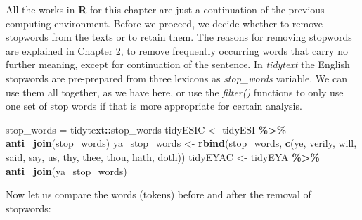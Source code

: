 \documentclass[
]{article}
\newenvironment{Shaded}{\begin{snugshade}}{\end{snugshade}}
\newcommand{\FunctionTok}[1]{\textcolor[rgb]{0.13,0.29,0.53}{\textbf{#1}}}
\newcommand{\NormalTok}[1]{#1}
\newcommand{\OtherTok}[1]{\textcolor[rgb]{0.56,0.35,0.01}{#1}}
\newcommand{\SpecialCharTok}[1]{\textcolor[rgb]{0.81,0.36,0.00}{\textbf{#1}}}
\newcommand{\StringTok}[1]{\textcolor[rgb]{0.31,0.60,0.02}{#1}}
\begin{document}
All the works in \textbf{R} for this chapter are just a continuation of the previous computing environment. Before we proceed, we decide whether to remove stopwords from the texts or to retain them. The reasons for removing stopwords are explained in Chapter 2, to remove frequently occurring words that carry no further meaning, except for continuation of the sentence. In \emph{tidytext} the English stopwords are pre-prepared from three lexicons as \emph{stop\_words} variable. We can use them all together, as we have here, or use the \emph{filter()} functions to only use one set of stop words if that is more appropriate for certain analysis.

\footnotesize

\begin{Shaded}
\begin{Highlighting}[]
\NormalTok{stop\_words }\OtherTok{=}\NormalTok{ tidytext}\SpecialCharTok{::}\NormalTok{stop\_words}
\NormalTok{tidyESIC }\OtherTok{\textless{}{-}}\NormalTok{ tidyESI }\SpecialCharTok{\%\textgreater{}\%}
  \FunctionTok{anti\_join}\NormalTok{(stop\_words)}
\NormalTok{ya\_stop\_words }\OtherTok{\textless{}{-}} \FunctionTok{rbind}\NormalTok{(stop\_words,}
                      \FunctionTok{c}\NormalTok{(}\StringTok{\textquotesingle{}ye\textquotesingle{}}\NormalTok{, }\StringTok{\textquotesingle{}verily\textquotesingle{}}\NormalTok{, }\StringTok{\textquotesingle{}will\textquotesingle{}}\NormalTok{, }\StringTok{\textquotesingle{}said\textquotesingle{}}\NormalTok{, }
                        \StringTok{\textquotesingle{}say\textquotesingle{}}\NormalTok{, }\StringTok{\textquotesingle{}us\textquotesingle{}}\NormalTok{, }\StringTok{\textquotesingle{}thy\textquotesingle{}}\NormalTok{, }\StringTok{\textquotesingle{}thee\textquotesingle{}}\NormalTok{, }
                        \StringTok{\textquotesingle{}thou\textquotesingle{}}\NormalTok{, }\StringTok{\textquotesingle{}hath\textquotesingle{}}\NormalTok{, }\StringTok{\textquotesingle{}doth\textquotesingle{}}\NormalTok{))}
\NormalTok{tidyEYAC }\OtherTok{\textless{}{-}}\NormalTok{ tidyEYA }\SpecialCharTok{\%\textgreater{}\%}
  \FunctionTok{anti\_join}\NormalTok{(ya\_stop\_words)}
\end{Highlighting}
\end{Shaded}

\normalsize

Now let us compare the words (tokens) before and after the removal of stopwords:
\end{document}
